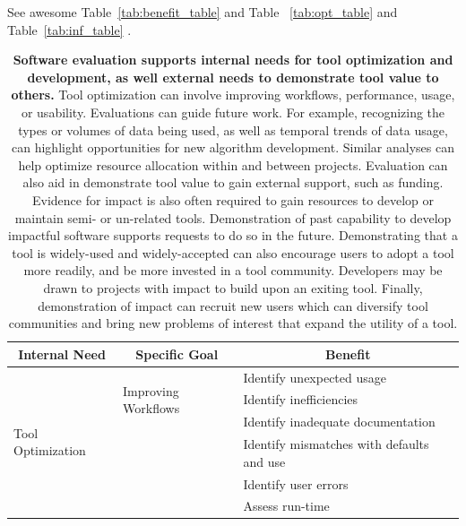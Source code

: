 \documentclass{article}
\begin{document}
See awesome Table~\ref{tab:benefit_table}  and Table ~\ref{tab:opt_table} and Table~\ref{tab:inf_table} .
\renewcommand{\arraystretch}{1.1} %


\begin{table}
 \caption{\textbf{Software evaluation supports internal needs for tool optimization and development, as well external needs to demonstrate tool value 
 to others.} Tool optimization can involve improving workflows, performance, usage, or usability. Evaluations can guide future work. For example, recognizing the types or volumes of data being used, as well as temporal trends of data usage, can highlight opportunities for new algorithm development. Similar analyses can help optimize resource allocation within and between projects. Evaluation can also aid in demonstrate tool value to gain external support, such as funding.  Evidence for impact is also often required to gain resources to develop or maintain semi- or un-related tools. Demonstration of past capability to develop impactful software supports requests to do so in the future.  Demonstrating that a tool is widely-used and widely-accepted can also encourage users to adopt a tool more readily, and be more invested in a tool community. Developers may be drawn to projects with impact to build upon an exiting tool. Finally, demonstration of impact can recruit new users which can diversify tool communities and bring new problems of interest that expand the utility of a tool.}
  \centering
  \begin{tabular} {|p{}|p{}|p{}|}
    \hline
    \multicolumn{1}{|c|}{\cellcolor[gray]{.9} \textbf{Internal Need}} 
    & \multicolumn{1}{|c|}{\cellcolor[gray]{.9} \textbf{Specific Goal}}
    & \multicolumn{1}{|c|}{\cellcolor[gray]{.9} \textbf{Benefit}}\\[1.1ex]
    \hline
    \multirow{17}{*}{Tool Optimization}               
    & \multirow{3}{*}{Improving Workflows} & 
    Identify unexpected usage \\
    & &
    Identify inefficiencies \\
    & &
    Identify inadequate documentation\\ \cline{2-3}
    &   \multirow{4}{*}{  }
    & 
     Identify mismatches with defaults and use \\
     &  Improve Performance  &
     Identify user errors \\
    &  &
    Assess run-time \\

\end{tabular}
\end{table}
\end{document}
